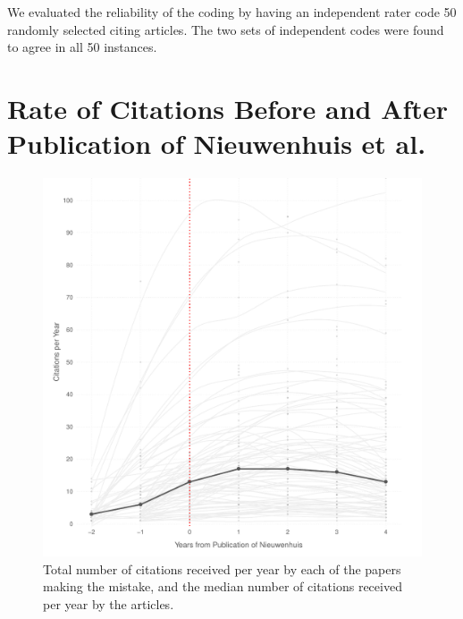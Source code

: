 \documentclass[12pt, letterpaper]{article}
\begin{document}
We evaluated the reliability of the coding by having an independent rater code 50 randomly selected citing articles. The two sets of independent codes were found to agree in all 50 instances.
\clearpage

\section{Rate of Citations Before and After Publication of Nieuwenhuis et al.}

\begin{figure}[H]
\centering
\includegraphics[scale=.7]{../figs/nw_median_growth_curve.pdf}
\caption{Total number of citations received per year by each of the papers making the mistake, and the median number of citations received per year by the articles.}
\label{fig:median_niewenhuis}
\end{figure}
\end{document}
